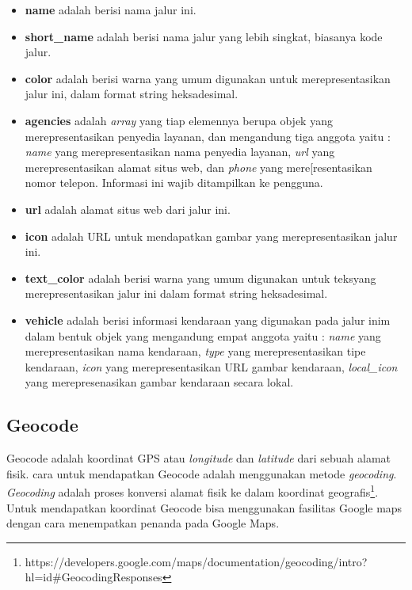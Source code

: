 \begin{itemize}
	\item \textbf{name} adalah berisi nama jalur ini.
	\item \textbf{short\_name} adalah berisi nama jalur yang lebih singkat, biasanya kode jalur.
	\item \textbf{color} adalah berisi warna yang umum digunakan untuk merepresentasikan jalur ini, dalam format string heksadesimal.
	\item \textbf{agencies} adalah \textit{array} yang tiap elemennya berupa objek yang merepresentasikan penyedia layanan, dan mengandung tiga anggota yaitu : \textit{name} yang merepresentasikan nama penyedia layanan, \textit{url} yang merepresentasikan alamat situs web, dan \textit{phone} yang mere[resentasikan nomor telepon. Informasi ini wajib ditampilkan ke pengguna.
	\item \textbf{url} adalah alamat situs web dari jalur ini.
	\item \textbf{icon} adalah URL untuk mendapatkan gambar yang merepresentasikan jalur ini.
	\item \textbf{text\_color} adalah berisi warna yang umum digunakan untuk teksyang merepresentasikan jalur ini dalam format string heksadesimal.
	\item \textbf{vehicle} adalah berisi informasi kendaraan yang digunakan pada jalur inim dalam bentuk objek yang mengandung empat anggota yaitu : \textit{name} yang merepresentasikan nama kendaraan, \textit{type} yang merepresentasikan tipe kendaraan, \textit{icon} yang merepresentasikan URL gambar kendaraan, \textit{local\_icon} yang merepresenasikan gambar kendaraan secara lokal.
\end{itemize}

\subsection{Geocode}
\label{subsec:Geocode}
Geocode adalah koordinat GPS atau \textit{longitude} dan \textit{latitude} dari sebuah alamat fisik. cara untuk mendapatkan Geocode adalah menggunakan metode \textit{geocoding}. \textit{Geocoding} adalah proses konversi alamat fisik ke dalam koordinat geografis\footnote{https://developers.google.com/maps/documentation/geocoding/intro?hl=id#GeocodingResponses}. Untuk mendapatkan koordinat Geocode bisa menggunakan fasilitas Google maps dengan cara menempatkan penanda pada Google Maps.